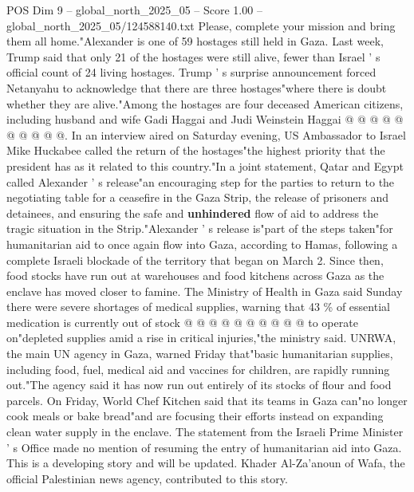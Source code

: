 \begin{textsample}{POS Dim 9 – global\_north\_2025\_05 – Score 1.00 – global\_north\_2025\_05/124588140.txt}
Please, complete your mission and bring them all home."Alexander is one of 59 hostages still held in Gaza.
Last week, Trump said that only 21 of the hostages were still alive, fewer than Israel ' s official count of 24 living hostages.
Trump ' s surprise announcement forced Netanyahu to acknowledge that there are three hostages"where there is doubt whether they are alive."Among the hostages are four deceased American citizens, including husband and wife Gadi Haggai and Judi Weinstein Haggai @ @ @ @ @ @ @ @ @ @.
In an interview aired on Saturday evening, US Ambassador to Israel Mike Huckabee called the return of the hostages"the highest priority that the president has as it related to this country."In a joint statement, Qatar and Egypt called Alexander ' s release"an encouraging step for the parties to return to the negotiating table for a ceasefire in the Gaza Strip, the release of prisoners and detainees, and ensuring the safe and \textbf{unhindered} flow of aid to address the tragic situation in the Strip."Alexander ' s release is"part of the steps taken"for humanitarian aid to once again flow into Gaza, according to Hamas, following a complete Israeli blockade of the territory that began on March 2.
Since then, food stocks have run out at warehouses and food kitchens across Gaza as the enclave has moved closer to famine.
The Ministry of Health in Gaza said Sunday there were severe shortages of medical supplies, warning that 43 \% of essential medication is currently out of stock @ @ @ @ @ @ @ @ @ @ to operate on"depleted supplies amid a rise in critical injuries,"the ministry said.
UNRWA, the main UN agency in Gaza, warned Friday that"basic humanitarian supplies, including food, fuel, medical aid and vaccines for children, are rapidly running out."The agency said it has now run out entirely of its stocks of flour and food parcels.
On Friday, World Chef Kitchen said that its teams in Gaza can"no longer cook meals or bake bread"and are focusing their efforts instead on expanding clean water supply in the enclave.
The statement from the Israeli Prime Minister ' s Office made no mention of resuming the entry of humanitarian aid into Gaza.
This is a developing story and will be updated.
Khader Al-Za'anoun of Wafa, the official Palestinian news agency, contributed to this story.

\end{textsample}
